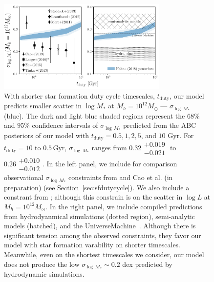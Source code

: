 \documentclass[12pt, letterpaper, preprint, tighten]{aastex62}
\newcommand{\ch}[1]{\color{orange}{\bf CH:} #1}
\begin{document}
\begin{figure}
\begin{center}
\includegraphics[width=0.75\textwidth]{figs/SHMRscatter_tduty_v2.pdf}
    \caption{With shorter star formation duty cycle timescales, $t_\mathrm{duty}$, 
    our model predicts smaller scatter in $\log M_*$ at $M_h = 10^{12} M_\odot$ --- $\sigma_{\log\,M_*}$ (blue). 
    The dark and light blue shaded regions represent the $68\%$ and $95\%$ confidence 
    intervals of $\sigma_{\log\,M_*}$ predicted from the ABC posteriors of our 
    model with $t_\mathrm{duty} = 0.5, 1, 2, 5$, and $10$ Gyr. For $t_\mathrm{duty} = 10$ 
    to $0.5\,\mathrm{Gyr}$, $\sigma_{\log\,M_*}$ ranges from {\ch $0.32\substack{+0.019\\ -0.021}$ to 
    $0.26\substack{+0.010\\-0.012}$}. In the left panel, we include for comparison
    observational $\sigma_{\log\,M_*}$ constraints from \cite{yang2009, more2011, leauthaud2012, tinker2013, zu2015} 
    and Cao et al. (in preparation) (see Section~\ref{sec:sfdutycycle}). We also
    include a constrant from \cite{lange2018a}; although this constrain is on the 
    scatter in $\log L$ at $M_h = 10^{12} M_\odot$. In the right panel, we include 
    compiled predictions from hydrodyanmical simulations (dotted region), semi-analytic 
    models (hatched), and the {\sc UniverseMachine}~\citep[][dashed]{behroozi2018}.
    Although there is significant tension among the observed constraints, they 
    favor our model with star formation varability on shorter timescales. Meanwhile, 
    even on the shortest timescales we consider, our model does not produce the low 
    $\sigma_{\log\,M_*} \sim 0.2$ dex predicted by hydrodynamic simulations.
    }
\label{fig:sigMstar_duty}
\end{center}
\end{figure}
\end{document}
